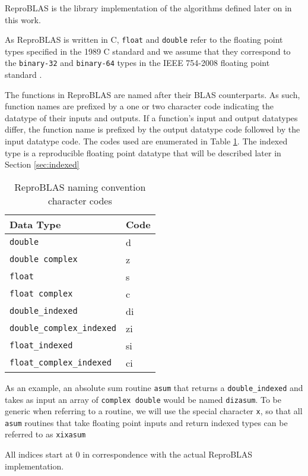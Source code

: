 
  ReproBLAS is the library implementation of the algorithms defined later on in this work.

  As ReproBLAS is written in C, \texttt{float} and \texttt{double} refer to the
  floating point types specified in the 1989 C standard \cite{c89} and we
  assume that they correspond to the \texttt{binary-32} and \texttt{binary-64}
  types in the IEEE 754-2008 floating point standard \cite{ieee754}.

  The functions in ReproBLAS are named after their BLAS counterparts.
  As such, function names are prefixed by a one or two character code indicating the datatype of their inputs and outputs. If a function's input and output datatypes differ, the function name is prefixed by the output datatype code followed by the input datatype code.
  The codes used are enumerated in Table \ref{tbl:blas_naming_codes}. The indexed type is a reproducible floating point datatype that will be described later in Section \ref{sec:indexed}
  \begin{table}[!htbp]
    \caption{ReproBLAS naming convention character codes}
    \label{tbl:blas_naming_codes}
        \centering
        \begin{tabular}{ | l | l | } \hline
            Data Type & Code \\ \hline
            \texttt{double} & d \\ \hline
            \texttt{double complex} & z \\ \hline
            \texttt{float} & s \\ \hline
            \texttt{float complex} & c \\ \hline
            \texttt{double\_indexed} & di \\ \hline
            \texttt{double\_complex\_indexed} & zi \\ \hline
            \texttt{float\_indexed} & si \\ \hline
            \texttt{float\_complex\_indexed} & ci \\ \hline
        \end{tabular}
  \end{table}
  As an example, an absolute sum routine \texttt{asum} that returns a \texttt{double\_indexed} and takes as input an array of \texttt{complex double} would be named \texttt{dizasum}. To be generic when referring to a routine, we will use the special character \texttt{x}, so that all \texttt{asum} routines that take floating point inputs and return indexed types can be referred to as \texttt{xixasum}

  All indices start at $0$ in correspondence with the actual ReproBLAS implementation.

